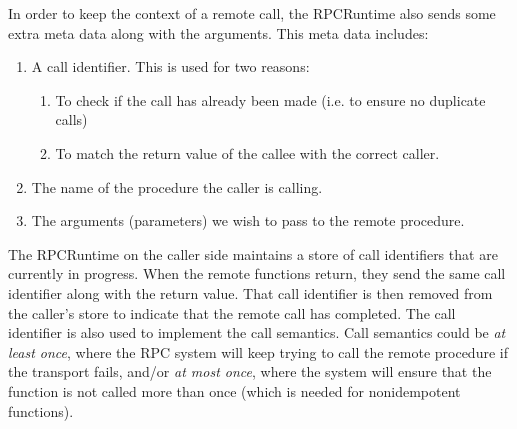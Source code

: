 In order to keep the context of a remote call, the RPCRuntime also sends some extra meta data along with the arguments. This meta data includes:

\begin{enumerate}
	\item A call identifier. This is used for two reasons:
	\begin{enumerate}
		\item To check if the call has already been made (i.e. to ensure no duplicate calls)
		\item To match the return value of the callee with the correct caller.
	\end{enumerate}
	\item The name of the procedure the caller is calling.
	\item The arguments (parameters) we wish to pass to the remote procedure.
\end{enumerate}

The RPCRuntime on the caller side maintains a store of call identifiers that are currently in progress. When the remote functions return, they send the same call identifier along with the return value. That call identifier is then removed from the caller's store to indicate that the remote call has completed. The call identifier is also used to implement the call semantics. Call semantics could be \emph{at least once}, where the RPC system will keep trying to call the remote procedure if the transport fails, and/or \emph{at most once}, where the system will ensure that the function is not called more than once (which is needed for nonidempotent functions).

